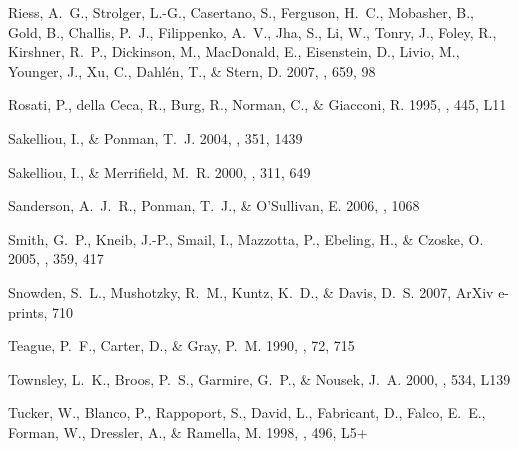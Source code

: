 \documentclass[12pt,preprint]{aastex}
\begin{document}
\begin{thebibliography}{}
{Riess}, A.~G., {Strolger}, L.-G., {Casertano}, S., {Ferguson}, H.~C.,
  {Mobasher}, B., {Gold}, B., {Challis}, P.~J., {Filippenko}, A.~V., {Jha}, S.,
  {Li}, W., {Tonry}, J., {Foley}, R., {Kirshner}, R.~P., {Dickinson}, M.,
  {MacDonald}, E., {Eisenstein}, D., {Livio}, M., {Younger}, J., {Xu}, C.,
  {Dahl{\'e}n}, T., \& {Stern}, D. 2007, \apj, 659, 98

{Rosati}, P., {della Ceca}, R., {Burg}, R., {Norman}, C., \& {Giacconi}, R.
  1995, \apjl, 445, L11

{Sakelliou}, I., \& {Ponman}, T.~J. 2004, \mnras, 351, 1439

{Sakelliou}, I., \& {Merrifield}, M.~R. 2000, \mnras, 311, 649

{Sanderson}, A.~J.~R., {Ponman}, T.~J., \& {O'Sullivan}, E. 2006, \mnras, 1068

{Smith}, G.~P., {Kneib}, J.-P., {Smail}, I., {Mazzotta}, P., {Ebeling}, H., \&
  {Czoske}, O. 2005, \mnras, 359, 417

{Snowden}, S.~L., {Mushotzky}, R.~M., {Kuntz}, K.~D., \& {Davis}, D.~S. 2007,
  ArXiv e-prints, 710

{Teague}, P.~F., {Carter}, D., \& {Gray}, P.~M. 1990, \apjs, 72, 715

{Townsley}, L.~K., {Broos}, P.~S., {Garmire}, G.~P., \& {Nousek}, J.~A. 2000,
  \apjl, 534, L139

{Tucker}, W., {Blanco}, P., {Rappoport}, S., {David}, L., {Fabricant}, D.,
  {Falco}, E.~E., {Forman}, W., {Dressler}, A., \& {Ramella}, M. 1998, \apjl,
  496, L5+


\end{thebibliography}
\end{document}
